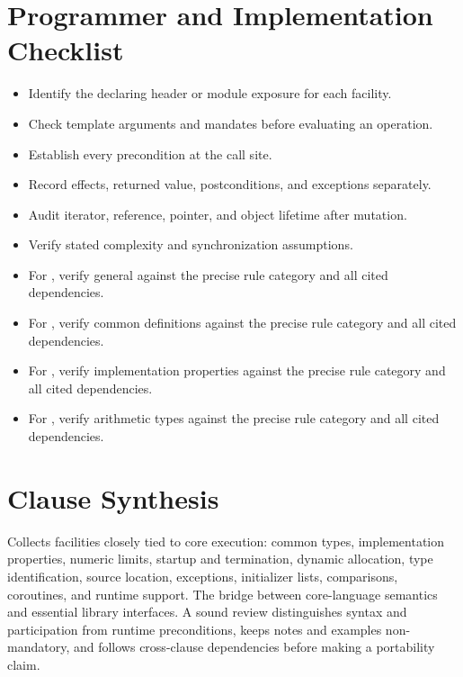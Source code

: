 \documentclass[11pt,letterpaper]{article}
\begin{document}
\section{Programmer and Implementation Checklist}
\begin{CornellReferenceChecklistBox}\begin{itemize}[label=$\square$]
\item Identify the declaring header or module exposure for each facility.
\item Check template arguments and mandates before evaluating an operation.
\item Establish every precondition at the call site.
\item Record effects, returned value, postconditions, and exceptions separately.
\item Audit iterator, reference, pointer, and object lifetime after mutation.
\item Verify stated complexity and synchronization assumptions.
\item For , verify general against the precise rule category and all cited dependencies.
\item For , verify common definitions against the precise rule category and all cited dependencies.
\item For , verify implementation properties against the precise rule category and all cited dependencies.
\item For , verify arithmetic types against the precise rule category and all cited dependencies.
\end{itemize}\end{CornellReferenceChecklistBox}
\section{Clause Synthesis}
\begin{CornellReferenceOrientationBox}Collects facilities closely tied to core execution: common types, implementation properties, numeric limits, startup and termination, dynamic allocation, type identification, source location, exceptions, initializer lists, comparisons, coroutines, and runtime support. The bridge between core-language semantics and essential library interfaces. A sound review distinguishes syntax and participation from runtime preconditions, keeps notes and examples non-mandatory, and follows cross-clause dependencies before making a portability claim.\end{CornellReferenceOrientationBox}
\end{document}
